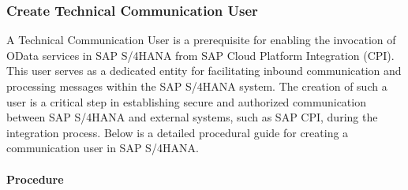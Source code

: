 \subsubsection{Create Technical Communication User }

A Technical Communication User is a prerequisite for enabling the invocation of OData services in SAP S/4HANA from SAP Cloud Platform Integration (CPI). This user serves as a dedicated entity for facilitating inbound communication and processing messages within the SAP S/4HANA system. The creation of such a user is a critical step in establishing secure and authorized communication between SAP S/4HANA and external systems, such as SAP CPI, during the integration process. Below is a detailed procedural guide for creating a communication user in SAP S/4HANA.

\paragraph{Procedure}
